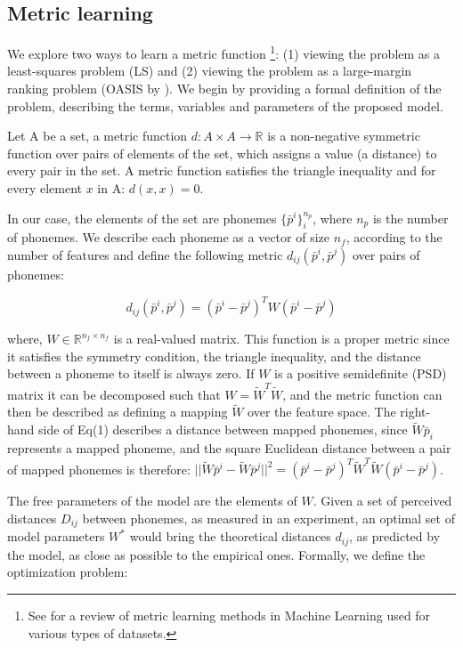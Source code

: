 \subsection{Metric learning}
We explore two ways to learn a metric function \footnote{See \citet{Kulis2012} for a review of metric learning methods in Machine Learning used for various types of datasets.}: (1) viewing the problem as a least-squares problem (LS) and (2) viewing the problem as a large-margin ranking problem (OASIS by \citet{Chechik2010}). We begin by providing a formal definition of the problem, describing the terms, variables and parameters of the proposed model.

Let A be a set, a metric function $d: A \times A \to \mathbb{R}$ is a non-negative symmetric function over pairs of elements of the set, which assigns a value (a distance) to every pair in the set. A metric function satisfies the triangle inequality and for every element $x$ in A: $d(x, x) = 0$.

In our case, the elements of the set are phonemes $\{\bar{p}^i\}_i^{n_p}$, where $n_p$ is the number of phonemes. We describe each phoneme as a vector of size $n_f$, according to the number of features and define the following metric $d_{ij}(\bar{p}^i, \bar{p}^j)$ over pairs of phonemes:

\begin{equation}
    d_{ij}(\bar{p}^i, \bar{p}^j) = (\bar{p}^i - \bar{p}^j)^T W (\bar{p}^i - \bar{p}^j)
\end{equation}

where, $W \in \mathbb{R} ^{n_f \times n_f}$ is a real-valued matrix. This function is a proper metric since it satisfies the symmetry condition, the triangle inequality, and the distance between a phoneme to itself is always zero. If $W$ is a positive semidefinite (PSD) matrix it can be decomposed such that $W = \widetilde{W}^T\widetilde{W}$, and the metric function can then be described as defining a mapping $\widetilde{W}$ over the feature space. The right-hand side of Eq(1) describes a distance between mapped phonemes, since $\widetilde{W}\bar{p}_i$ represents a mapped phoneme, and the square Euclidean distance between a pair of mapped phonemes is therefore: $||\widetilde{W}\bar{p}^i - \widetilde{W}\bar{p}^j||^2 = (\bar{p}^i - \bar{p}^j)^T\widetilde{W}^T\widetilde{W}(\bar{p}^i - \bar{p}^j)$.

The free parameters of the model are the elements of $W$. Given a set of perceived distances ${D_{ij}}$ between phonemes, as measured in an experiment, an optimal set of model parameters $W^\ast$ would bring the theoretical distances $d_{ij}$, as predicted by the model, as close as possible to the empirical ones. Formally, we define the optimization problem:

